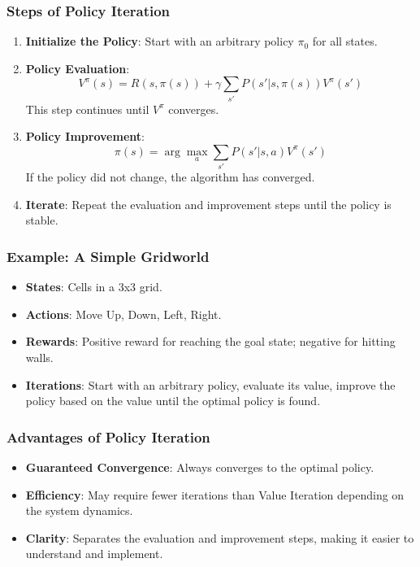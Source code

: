 \documentclass[aspectratio=169]{beamer}
\begin{document}
\begin{frame}[fragile]
    \frametitle{Steps of Policy Iteration}
    \begin{enumerate}
        \item \textbf{Initialize the Policy}: Start with an arbitrary policy \( \pi_0 \) for all states.
        
        \item \textbf{Policy Evaluation}:
        \begin{equation}
        V^\pi(s) = R(s, \pi(s)) + \gamma \sum_{s'} P(s'|s, \pi(s)) V^\pi(s')
        \end{equation}
        This step continues until \( V^\pi \) converges.
        
        \item \textbf{Policy Improvement}:
        \begin{equation}
        \pi(s) = \arg\max_a \sum_{s'} P(s'|s, a) V^\pi(s')
        \end{equation}
        If the policy did not change, the algorithm has converged.
        
        \item \textbf{Iterate}: Repeat the evaluation and improvement steps until the policy is stable.
    \end{enumerate}
\end{frame}

\begin{frame}[fragile]
    \frametitle{Example: A Simple Gridworld}
    \begin{itemize}
        \item \textbf{States}: Cells in a 3x3 grid.
        \item \textbf{Actions}: Move Up, Down, Left, Right.
        \item \textbf{Rewards}: Positive reward for reaching the goal state; negative for hitting walls.
        \item \textbf{Iterations}: Start with an arbitrary policy, evaluate its value, improve the policy based on the value until the optimal policy is found.
    \end{itemize}
\end{frame}

\begin{frame}[fragile]
    \frametitle{Advantages of Policy Iteration}
    \begin{itemize}
        \item \textbf{Guaranteed Convergence}: Always converges to the optimal policy.
        \item \textbf{Efficiency}: May require fewer iterations than Value Iteration depending on the system dynamics.
        \item \textbf{Clarity}: Separates the evaluation and improvement steps, making it easier to understand and implement.
    \end{itemize}
\end{frame}
\end{document}
